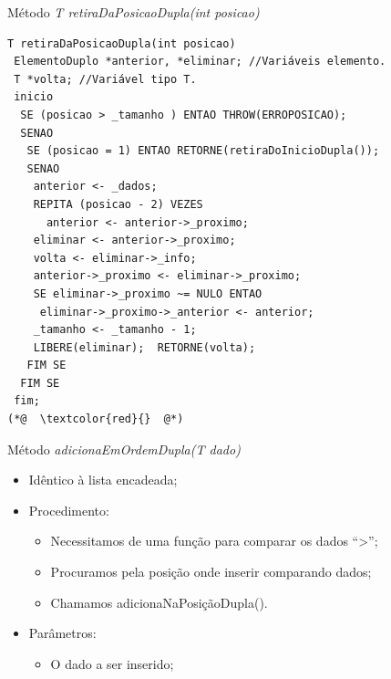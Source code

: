 \documentclass[12pt,table,xcolor={dvipsnames}]{beamer}
\begin{document}
\begin{frame}[fragile]{Método \textit{T retiraDaPosicaoDupla(int posicao)}}
\begin{lstlisting}
T retiraDaPosicaoDupla(int posicao)
 ElementoDuplo *anterior, *eliminar; //Variáveis elemento.
 T *volta; //Variável tipo T.
 inicio
  SE (posicao > _tamanho ) ENTAO THROW(ERROPOSICAO);
  SENAO
   SE (posicao = 1) ENTAO RETORNE(retiraDoInicioDupla());
   SENAO
    anterior <- _dados;
    REPITA (posicao - 2) VEZES 
      anterior <- anterior->_proximo;
    eliminar <- anterior->_proximo;
    volta <- eliminar->_info;
    anterior->_proximo <- eliminar->_proximo;
    SE eliminar->_proximo ~= NULO ENTAO
     eliminar->_proximo->_anterior <- anterior;
    _tamanho <- _tamanho - 1;
    LIBERE(eliminar);  RETORNE(volta);
   FIM SE
  FIM SE
 fim;
(*@  \textcolor{red}{}  @*)
\end{lstlisting}
\end{frame}

\begin{frame}[fragile]{Método \textit{adicionaEmOrdemDupla(T dado)}}

\begin{itemize}
\item Idêntico à lista encadeada;
\item Procedimento:
\begin{itemize}
\item Necessitamos de uma função para comparar os dados ``>'';
\item Procuramos pela posição onde inserir comparando dados;
\item Chamamos adicionaNaPosiçãoDupla().
\end{itemize}
\item Parâmetros:
\begin{itemize}
\item O dado a ser inserido;
\end{itemize}
\end{itemize}
\end{frame}
\end{document}

